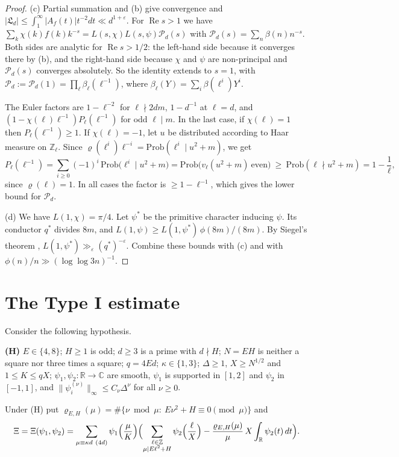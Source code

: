 \documentclass[11pt]{amsart}
\theoremstyle{remark}
\theoremstyle{definition}
\numberwithin{equation}{section}
\newcommand{\Z}{\mathbb{Z}}
\newcommand{\R}{\mathbb{R}}
\newcommand{\C}{\mathbb{C}}
\newcommand{\eps}{\varepsilon}
\newcommand{\Lf}{\mathfrak{L}}
\begin{document}
\begin{proof}
(c) Partial summation and (b) give convergence and $|\Lf_d|\le\int_1^\infty|A_f(t)|t^{-2}dt\ll d^{1+\eps}$. For $\operatorname{Re}s>1$ we have $\sum_k\chi(k)f(k)k^{-s}=L(s,\chi)L(s,\psi)\mathcal P_d(s)$ with $\mathcal P_d(s)=\sum_n\beta(n)n^{-s}$. Both sides are analytic for $\operatorname{Re}s>1/2$: the left-hand side because it converges there by (b), and the right-hand side because $\chi$ and $\psi$ are non-principal and $\mathcal P_d(s)$ converges absolutely. So the identity extends to $s=1$, with $\mathcal P_d:=\mathcal P_d(1)=\prod_\ell\beta_\ell(\ell^{-1})$, where $\beta_\ell(Y)=\sum_i\beta(\ell^i)Y^i$.

The Euler factors are $1-\ell^{-2}$ for $\ell\nmid2dm$, $1-d^{-1}$ at $\ell=d$, and $(1-\chi(\ell)\ell^{-1})P_\ell(\ell^{-1})$ for odd $\ell\mid m$. In the last case, if $\chi(\ell)=1$ then $P_\ell(\ell^{-1})\ge1$. If $\chi(\ell)=-1$, let $u$ be distributed according to Haar measure on $\Z_\ell$. Since $\varrho(\ell^i)\ell^{-i}=\mathrm{Prob}(\ell^i\mid u^2+m)$, we get
\[
P_\ell(\ell^{-1})=\sum_{i\ge0}(-1)^i\,\mathrm{Prob}\bigl(\ell^i\mid u^2+m\bigr)=\mathrm{Prob}\bigl(v_\ell(u^2+m)\ \text{even}\bigr)\ \ge\ \mathrm{Prob}(\ell\nmid u^2+m)=1-\frac1\ell,
\]
since $\varrho(\ell)=1$. In all cases the factor is $\ge1-\ell^{-1}$, which gives the lower bound for $\mathcal P_d$.

(d) We have $L(1,\chi)=\pi/4$. Let $\psi^*$ be the primitive character inducing $\psi$. Its conductor $q^*$ divides $8m$, and $L(1,\psi)\ge L(1,\psi^*)\,\phi(8m)/(8m)$. By Siegel's theorem \cite[Ch.~21]{Da}, $L(1,\psi^*)\gg_\eps(q^*)^{-\eps}$. Combine these bounds with (c) and with $\phi(n)/n\gg(\log\log 3n)^{-1}$.
\end{proof}

\section{The Type I estimate}\label{sec:typeI}

Consider the following hypothesis.

\medskip
\noindent\textbf{(H)} $E\in\{4,8\}$; $H\ge1$ is odd; $d\ge3$ is a prime with $d\nmid H$; $N=EH$ is neither a square nor three times a square; $q=4Ed$; $\kappa\in\{1,3\}$; $\Delta\ge1$, $X\ge N^{1/2}$ and $1\le K\le qX$; $\psi_1,\psi_2:\R\to\C$ are smooth, $\psi_1$ is supported in $[1,2]$ and $\psi_2$ in $[-1,1]$, and $\|\psi_i^{(\nu)}\|_\infty\le C_\nu\Delta^\nu$ for all $\nu\ge0$.
\medskip

Under (H) put $\varrho_{E,H}(\mu)=\#\{\nu\bmod\mu:\ E\nu^2+H\equiv0\pmod\mu\}$ and
\begin{equation}\label{eq:Xi}
\Xi=\Xi(\psi_1,\psi_2)=\sum_{\mu\equiv\kappa d\ (4d)}\psi_1\Bigl(\frac\mu K\Bigr)\Bigl(\sum_{\substack{\ell\in\Z\\ \mu\mid E\ell^2+H}}\psi_2\Bigl(\frac\ell X\Bigr)-\frac{\varrho_{E,H}(\mu)}{\mu}\,X\int_\R\psi_2(t)\,dt\Bigr).
\end{equation}
\end{document}
